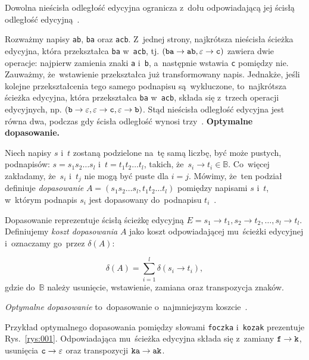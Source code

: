 \documentclass{praca1}
\begin{document}
\begin{lemma}
Dowolna nieścisła odległość edycyjna ogranicza z~dołu odpowiadającą jej ścisłą odległość edycyjną~\cite{Boytsov2011:indexingmethods}.
\end{lemma}

Rozważmy napisy \verb|ab|, \verb|ba| oraz \verb|acb|. Z~jednej strony, najkrótsza nieścisła ścieżka edycyjna, która przekształca \verb|ba| w~\verb|acb|, tj. $(\verb|ba| \rightarrow \verb|ab|, \varepsilon \rightarrow \verb|c|)$ zawiera dwie operacje: najpierw zamienia znaki \verb|a| i~\verb|b|, a~następnie wstawia \verb|c| pomiędzy nie. Zauważmy, że~wstawienie przekształca już transformowany napis. Jednakże, jeśli kolejne przekształcenia tego samego podnapisu są~wykluczone, to~najkrótsza ścieżka edycyjna, która przekształca \verb|ba| w~\verb|acb|, składa się z~trzech operacji edycyjnych, np. $(\verb|b| \rightarrow \varepsilon, \varepsilon \rightarrow \verb|c|, \varepsilon \rightarrow \verb|b|)$. Stąd nieścisła odległość edycyjna jest równa dwa, podczas gdy ścisła odległość wynosi trzy~\cite{Boytsov2011:indexingmethods}. 
\newpage
\textbf{Optymalne dopasowanie.} 
\begin{definition}
Niech napisy $s$ i~$t$ zostaną podzielone na~tę samą liczbę, być może pustych, podnapisów: $s = s_1 s_2 \ldots s_l$ i~$t = t_1 t_2 \ldots t_l$, takich, że~$s_i \rightarrow t_i \in \mathbb{B}$. Co~więcej zakładamy, że~$s_i$ i~$t_j$ nie mogą być puste dla $i = j$. Mówimy, że~ten podział definiuje \emph{dopasowanie} $A = (s_1 s_2\ldots s_l, t_1 t_2 \ldots t_l)$ pomiędzy napisami $s$ i~$t$, w~którym podnapis $s_i$ jest dopasowany do~podnapisu $t_i$~\cite{Boytsov2011:indexingmethods}.
\end{definition}

Dopasowanie reprezentuje ścisłą ścieżkę edycyjną $E = s_1 \rightarrow t_1, s_2 \rightarrow t_2, \ldots, s_l \rightarrow t_l$. Definiujemy \emph{koszt dopasowania} $A$ jako koszt odpowiadającej mu~ścieżki edycyjnej i~oznaczamy go~przez $\delta(A)$:

\begin{equation}
\label{eq:003}
\delta(A) = \sum\limits_{i = 1}^{l} \delta(s_i \rightarrow t_i),
\end{equation}
gdzie do~$\mathbb{B}$ należy usunięcie, wstawienie, zamiana oraz transpozycja znaków.

\emph{Optymalne dopasowanie} to~dopasowanie o~najmniejszym koszcie~\cite{Boytsov2011:indexingmethods}.


\begin{example}
Przykład optymalnego dopasowania pomiędzy słowami \verb|foczka| i~\verb|kozak| prezentuje Rys.~\ref{rys:001}. Odpowiadająca mu~ścieżka edycyjna składa się z~zamiany $\verb|f| \rightarrow \verb|k|$, usunięcia $\verb|c| \rightarrow \varepsilon$ oraz transpozycji $\verb|ka| \rightarrow \verb|ak|$.
\end{example}
\end{document}
